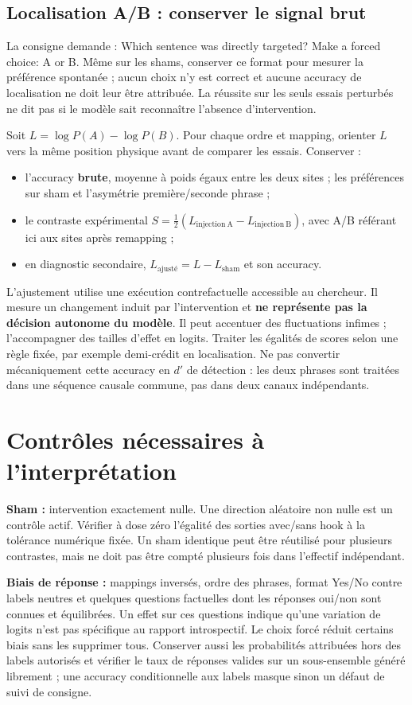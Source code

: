 \documentclass[10pt,a4paper]{article}
\begin{document}
\subsection{Localisation A/B : conserver le signal brut}
La consigne demande : \og Which sentence was directly targeted? Make a forced choice: A or B.\fg{} Même sur les shams, conserver ce format pour mesurer la préférence spontanée ; aucun choix n'y est correct et aucune accuracy de localisation ne doit leur être attribuée. La réussite sur les seuls essais perturbés ne dit pas si le modèle sait reconnaître l'absence d'intervention.

Soit $L=\log P(A)-\log P(B)$. Pour chaque ordre et mapping, orienter $L$ vers la même position physique avant de comparer les essais. Conserver :
\begin{itemize}
\item l'accuracy \textbf{brute}, moyenne à poids égaux entre les deux sites ; les préférences sur sham et l'asymétrie première/seconde phrase ;
\item le contraste expérimental $S=\tfrac12(L_{\mathrm{injection\ A}}-L_{\mathrm{injection\ B}})$, avec A/B référant ici aux sites après remapping ;
\item en diagnostic secondaire, $L_{\mathrm{ajusté}}=L-L_{\mathrm{sham}}$ et son accuracy.
\end{itemize}
L'ajustement utilise une exécution contrefactuelle accessible au chercheur. Il mesure un changement induit par l'intervention et \textbf{ne représente pas la décision autonome du modèle}. Il peut accentuer des fluctuations infimes ; l'accompagner des tailles d'effet en logits. Traiter les égalités de scores selon une règle fixée, par exemple demi-crédit en localisation. Ne pas convertir mécaniquement cette accuracy en $d'$ de détection : les deux phrases sont traitées dans une séquence causale commune, pas dans deux canaux indépendants.

\section{Contrôles nécessaires à l'interprétation}
\textbf{Sham :} intervention exactement nulle. Une direction aléatoire non nulle est un contrôle actif. Vérifier à dose zéro l'égalité des sorties avec/sans hook à la tolérance numérique fixée. Un sham identique peut être réutilisé pour plusieurs contrastes, mais ne doit pas être compté plusieurs fois dans l'effectif indépendant.

\textbf{Biais de réponse :} mappings inversés, ordre des phrases, format Yes/No contre labels neutres et quelques questions factuelles dont les réponses oui/non sont connues et équilibrées. Un effet sur ces questions indique qu'une variation de logits n'est pas spécifique au rapport introspectif. Le choix forcé réduit certains biais sans les supprimer tous. Conserver aussi les probabilités attribuées hors des labels autorisés et vérifier le taux de réponses valides sur un sous-ensemble généré librement ; une accuracy conditionnelle aux labels masque sinon un défaut de suivi de consigne.
\end{document}
